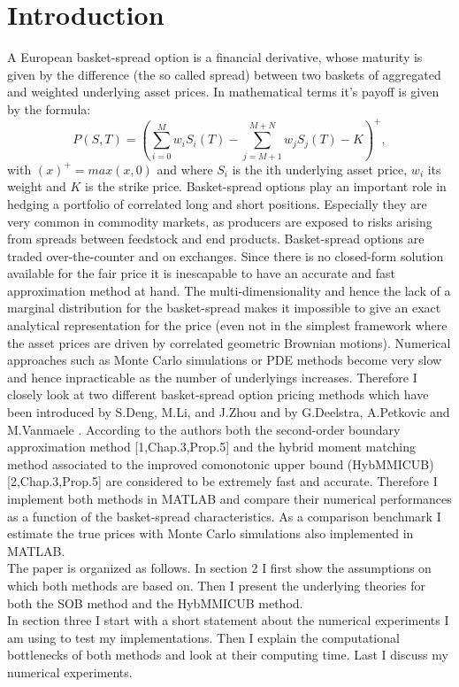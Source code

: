 \documentclass[a4paper]{article}
\begin{document}
\section{Introduction}
A European basket-spread option is a financial derivative, whose
maturity is given by the difference (the so called spread) between two 
baskets of aggregated and weighted underlying asset prices. In mathematical terms it's payoff is given by 
the formula:
\begin{equation}
\label{eq:po}
P(S,T) = (\sum_{i=0}^M w_iS_i(T) - \sum_{j=M+1}^{M+N} w_jS_j(T) - K)^+,
\end{equation}
with $(x)^+=max(x,0)$ and where $S_i$ is the ith underlying asset price, $w_i$ its weight and $K$ is the strike price.
Basket-spread options play an important role in hedging a portfolio of correlated long and short
positions. Especially they are very common in commodity markets,
as producers are exposed to risks arising from spreads between feedstock and end products.
Basket-spread options are traded over-the-counter and on exchanges. Since there is no
closed-form solution available for the fair price it is inescapable to have an accurate and
fast approximation method at hand. The multi-dimensionality and
hence the lack of a marginal distribution for the basket-spread makes it impossible to give an exact
analytical representation for the price (even not in the simplest framework
where the asset prices are driven by  correlated geometric Brownian motions). Numerical approaches such 
as Monte Carlo simulations or PDE methods become very slow and hence inpracticable as the number of underlyings increases. 
Therefore I closely look at two different basket-spread option pricing methods which have been 
introduced by S.Deng, M.Li, and J.Zhou \cite{sob} and by G.Deelstra, A.Petkovic and M.Vanmaele \cite{hybmmicub}. According to the authors both the second-order boundary approximation method [1,Chap.3,Prop.5] and the hybrid moment matching method associated to the improved comonotonic upper bound (HybMMICUB)
[2,Chap.3,Prop.5] are considered to be extremely fast and accurate. Therefore I implement both methods in MATLAB
and compare their numerical performances as a function of the basket-spread characteristics. 
As a comparison benchmark I estimate the true prices with Monte Carlo simulations also implemented in MATLAB.\\
The paper is organized as follows. In section 2 I first show the assumptions on which both methods are based on. Then I present the underlying theories for both the  SOB method and the HybMMICUB method.\\
In section three I start with a short statement about the numerical experiments I am using to test my implementations. Then I explain the computational bottlenecks of both methods and look at their computing time. Last I discuss my numerical experiments.
\end{document}
